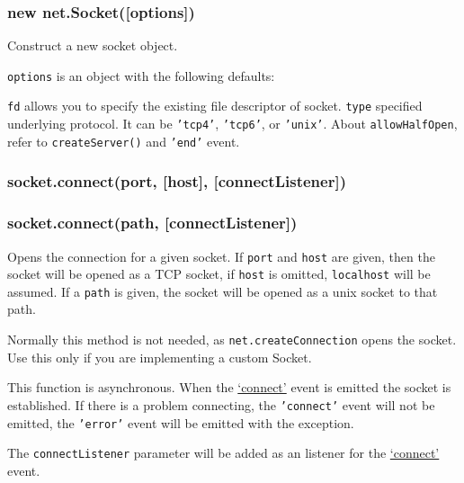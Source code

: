 \subsubsection{new net.Socket({[}options{]})}

Construct a new socket object.

\texttt{options} is an object with the following defaults:

\begin{Shaded}
\begin{Highlighting}[]
\NormalTok{\{ }
  \NormalTok{: }
\NormalTok{\}}
\end{Highlighting}
\end{Shaded}

\texttt{fd} allows you to specify the existing file descriptor of
socket. \texttt{type} specified underlying protocol. It can be
\texttt{'tcp4'}, \texttt{'tcp6'}, or \texttt{'unix'}. About
\texttt{allowHalfOpen}, refer to \texttt{createServer()} and
\texttt{'end'} event.

\subsubsection{socket.connect(port, {[}host{]}, {[}connectListener{]})}

\subsubsection{socket.connect(path, {[}connectListener{]})}

Opens the connection for a given socket. If \texttt{port} and
\texttt{host} are given, then the socket will be opened as a TCP socket,
if \texttt{host} is omitted, \texttt{localhost} will be assumed. If a
\texttt{path} is given, the socket will be opened as a unix socket to
that path.

Normally this method is not needed, as \texttt{net.createConnection}
opens the socket. Use this only if you are implementing a custom Socket.

This function is asynchronous. When the
\hyperref[net\_event\_connect]{`connect'} event is emitted the socket is
established. If there is a problem connecting, the \texttt{'connect'}
event will not be emitted, the \texttt{'error'} event will be emitted
with the exception.

The \texttt{connectListener} parameter will be added as an listener for
the \hyperref[net\_event\_connect]{`connect'} event.

